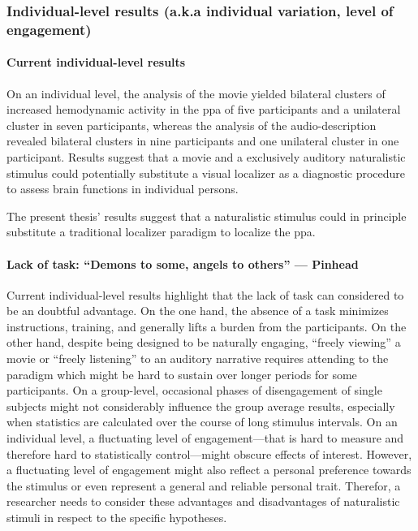 \subsubsection{Individual-level results (a.k.a individual variation, level of
engagement)}


\paragraph{Current individual-level results}

On an individual level, the analysis of the movie yielded bilateral clusters of
increased hemodynamic activity in the \ac{ppa} of five participants and a
unilateral cluster in seven participants, whereas the analysis of the
audio-description revealed bilateral clusters in nine participants and one
unilateral cluster in one participant.
Results suggest that a movie and a exclusively auditory naturalistic stimulus
could potentially substitute a visual localizer as a diagnostic procedure to
assess brain functions in individual persons.

%
The present thesis' results suggest that a naturalistic stimulus could in
principle substitute a traditional localizer paradigm to localize the \ac{ppa}.


\paragraph{Lack of task: ``Demons to some, angels to others'' --- Pinhead}


%
Current individual-level results highlight that the lack of task can considered
to be an doubtful advantage.
%
On the one hand, the absence of a task minimizes instructions, training, and
generally lifts a burden from the participants.
%
On the other hand, despite being designed to be naturally engaging, ``freely
viewing'' a movie or ``freely listening'' to an auditory narrative requires
attending to the paradigm which might be hard to sustain over longer periods for
some participants.
%
On a group-level, occasional phases of disengagement of single subjects might
not considerably influence the group average results, especially when statistics
are calculated over the course of long stimulus intervals.
%
On an individual level, a fluctuating level of engagement---that is hard to
measure and therefore hard to statistically control---might obscure effects of
interest.
%
However, a fluctuating level of engagement might also reflect a personal
preference towards the stimulus or even represent a general and reliable
personal trait.
%
Therefor, a researcher needs to consider these advantages and disadvantages of
naturalistic stimuli in respect to the specific hypotheses.


